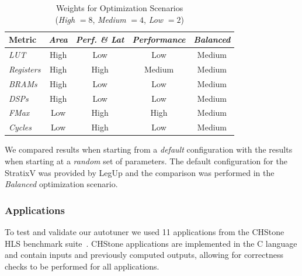 \begin{table}[htpb]
    \centering
    \begin{tabular}{@{}lcccc@{}}
        \toprule
        Metric & \textit{Area} & \textit{Perf. \& Lat} & \textit{Performance} & \textit{Balanced} \\ \midrule
        \textit{LUT} & \cellcolor[HTML]{9B94B6} High & \cellcolor[HTML]{DD9583} Low & \cellcolor[HTML]{DD9583} Low & \cellcolor[HTML]{E3DBB3} Medium \\
        \textit{Registers} & \cellcolor[HTML]{9B94B6} High & \cellcolor[HTML]{9B94B6} High & \cellcolor[HTML]{E3DBB3} Medium & \cellcolor[HTML]{E3DBB3} Medium \\
        \textit{BRAMs} & \cellcolor[HTML]{9B94B6} High & \cellcolor[HTML]{DD9583} Low & \cellcolor[HTML]{DD9583} Low & \cellcolor[HTML]{E3DBB3} Medium \\
        \textit{DSPs} & \cellcolor[HTML]{9B94B6} High & \cellcolor[HTML]{DD9583} Low & \cellcolor[HTML]{DD9583} Low & \cellcolor[HTML]{E3DBB3} Medium \\
        \textit{FMax} & \cellcolor[HTML]{DD9583} Low & \cellcolor[HTML]{9B94B6} High & \cellcolor[HTML]{9B94B6} High & \cellcolor[HTML]{E3DBB3} Medium \\
        \textit{Cycles} & \cellcolor[HTML]{DD9583} Low & \cellcolor[HTML]{9B94B6} High & \cellcolor[HTML]{DD9583} Low & \cellcolor[HTML]{E3DBB3} Medium \\ \bottomrule
    \end{tabular}
    \caption{Weights for Optimization Scenarios \\ (\textit{High} $= 8$, \textit{Medium} $= 4$, \textit{Low} $= 2$)}
    \label{tab:scenarios}
\end{table}

We compared results when starting from a \textit{default} configuration with
the results when starting at a \textit{random} set of parameters. The default
configuration for the StratixV was provided by LegUp and the comparison was
performed in the \textit{Balanced} optimization scenario.

\subsubsection{Applications}

To test and validate our autotuner we used 11 applications from the CHStone HLS
benchmark suite~\cite{hara2008chstone}. CHStone applications are implemented in
the C language and contain inputs and previously computed outputs, allowing for
correctness checks to be performed for all applications.

